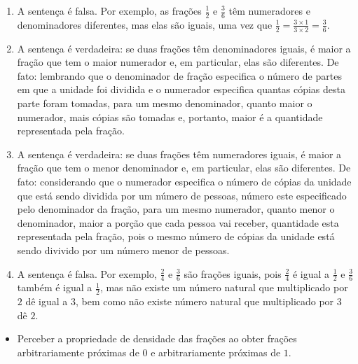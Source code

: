 \begin{multicols}{2}
\begin{solucao}{}{}
\begin{enumerate} [\quad a)] %
    \item A sentença é falsa. Por exemplo, as frações $\frac{1}{2}$ e
$\frac{3}{6}$ têm numeradores e denominadores diferentes, mas elas são iguais,
uma vez que $\frac{1}{2} = \frac{3 \times 1}{3 \times 2} = \frac{3}{6}$.
    \item A sentença é verdadeira: se duas frações têm denominadores iguais, é
maior a fração que tem o maior numerador e, em particular, elas são diferentes.
De fato: lembrando que o denominador de fração especifica o número de partes em
que a unidade foi dividida e o numerador especifica quantas cópias desta parte
foram tomadas, para um mesmo denominador, quanto maior o numerador, mais cópias
são tomadas e, portanto, maior é a quantidade representada pela fração.
    \item  A sentença é verdadeira: se duas frações têm numeradores iguais, é
maior a fração que tem o menor denominador e, em particular, elas são
diferentes. De fato: considerando que o numerador especifica o número de cópias
da unidade que está sendo dividida por um número de pessoas, número este
especificado pelo denominador da fração, para um mesmo numerador, quanto menor o
denominador, maior a porção que cada pessoa vai receber, quantidade esta
representada pela fração, pois o mesmo número de cópias da unidade está sendo
divivido por um número menor de pessoas.
    \item A sentença é falsa. Por exemplo, $\frac{2}{4}$ e $\frac{3}{6}$ são
frações iguais, pois $\frac{2}{4}$ é igual a $\frac{1}{2}$ e $\frac{3}{6}$
também é igual a $\frac{1}{2}$, mas não existe um número natural que
multiplicado por $2$ dê igual a $3$, bem como não existe número natural que
multiplicado por $3$ dê $2$.
\end{enumerate}
\end{solucao}

\begin{objetivos}[label=chap4-ativ24]{}{}
\begin{itemize} %
    \item       Perceber a propriedade de densidade das frações ao obter frações
arbitrariamente próximas de       $0$       e arbitrariamente próximas de
$1$.
\end{itemize} %
\end{objetivos}

\begin{orientacoes}{}{}


\end{orientacoes}
\end{multicols}
